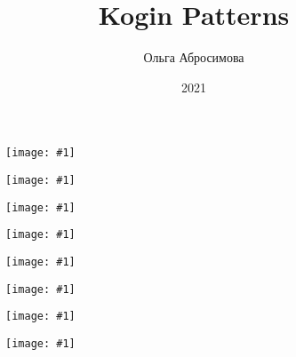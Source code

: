 \documentclass[12pt,twoside,openany,b5paper]{book}
\newcommand{\figp}[1]{
  \begin{figure}
  \begin{center}
  \texttt{[image: \#1]}
  \end{center}
  \end{figure}
}
\begin{document}
\title{Kogin Patterns}
\author{Ольга Абросимова}
\date{2021}
\maketitle

\figp{1}

\figp{2}

\figp{3}

\figp{4}

\figp{5}

\figp{6}

\figp{7}

\figp{8}
\end{document}
